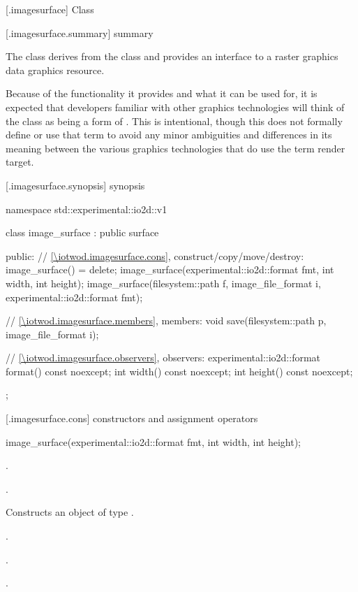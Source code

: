  [\iotwod.imagesurface] {Class }

 [\iotwod.imagesurface.summary] { summary}

\pnum
{}
The class  derives from the  class and provides an interface to a raster graphics data graphics resource.

\pnum
\begin{note}
Because of the functionality it provides and what it can be used for, it is expected that developers familiar with other graphics technologies will think of the  class as being a form of . This is intentional, though this \documenttypename{} does not formally define or use that term to avoid any minor ambiguities and differences in its meaning between the various graphics technologies that do use the term render target.
\end{note}

 [\iotwod.imagesurface.synopsis] { synopsis}

\begin{codeblock}
namespace std::experimental::io2d::v1 {
  class image_surface : public surface {
  public:
    // \ref{\iotwod.imagesurface.cons}, construct/copy/move/destroy:
    image_surface() = delete;
    image_surface(experimental::io2d::format fmt, int width, int height);
    image_surface(filesystem::path f, image_file_format i, 
      experimental::io2d::format fmt);
    
    // \ref{\iotwod.imagesurface.members}, members:
    void save(filesystem::path p, image_file_format i);
    
    // \ref{\iotwod.imagesurface.observers}, observers:
    experimental::io2d::format format() const noexcept;
    int width() const noexcept;
    int height() const noexcept;
  };
}
\end{codeblock}

 [\iotwod.imagesurface.cons] { constructors and assignment operators}

\begin{itemdecl}
image_surface(experimental::io2d::format fmt, int width, int height);
\end{itemdecl}
\begin{itemdescr}
\pnum
\requires
{}.

\pnum
{}.

\pnum
\effects
Constructs an object of type .

\pnum
\postconditions
{}.

\pnum
{}.

\pnum
{}.
\end{itemdescr}

